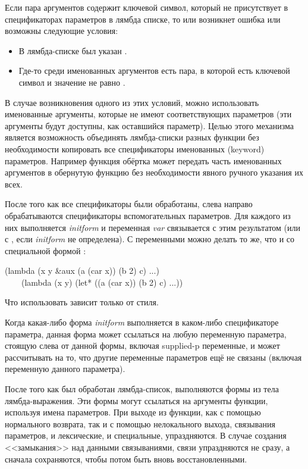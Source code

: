 Если пара аргументов содержит ключевой символ, который не
присутствует в спецификаторах параметров в лямбда списке, то или возникнет
ошибка или возможны следующие условия:
\begin{itemize}
\item
В лямбда-списке был указан .

\item
Где-то среди именованных аргументов есть пара, в которой есть ключевой символ
 и значение не равно {\false}.
\end{itemize}

В случае возникновения одного из этих условий, можно использовать именованные
аргументы, которые не имеют соответствующих параметров (эти аргументы будут
доступны, как оставшийся  параметр). 
Целью этого механизма является возможность объединять лямбда-списки разных
функции без необходимости копировать все спецификаторы именованных (keyword)
параметров. Например функция обёртка может передать часть именованных аргументов
в обернутую функцию без необходимости явного ручного указания их всех. 

После того как все спецификаторы были обработаны, слева направо обрабатываются
спецификаторы вспомогательных параметров. Для каждого из них выполняется
\emph{initform} и переменная \emph{var} связывается с этим результатом (или
с {\false}, если \emph{initform} не определена). С  переменными
можно делать то же, что и со специальной формой :
\begin{lisp}
(lambda (x y \&aux (a (car x)) (b 2) c) ...) \\
~~~\EQ\ (lambda (x y) (let* ((a (car x)) (b 2) c) ...))
\end{lisp}

Что использовать зависит только от стиля.

Когда какая-либо форма \emph{initform} выполняется в каком-либо спецификаторе
параметра, данная форма может ссылаться на любую переменную параметра, стоящую
слева от данной формы, включая supplied-p переменные, и может рассчитывать на
то, что другие переменные параметров ещё не связаны (включая переменную данного
параметра).

После того как был обработан лямбда-список, выполняются формы из тела
лямбда-выражения. Эти формы могут ссылаться на аргументы функции, используя
имена параметров. При выходе из функции, как с помощью нормального возврата, так
и с помощью нелокального выхода, связывания параметров, и лексические, и
специальные, упраздняются. В случае создания <<замыкания>> над данными
связываниями, связи упраздняются не сразу, а сначала сохраняются, чтобы потом
быть вновь восстановленными. 

